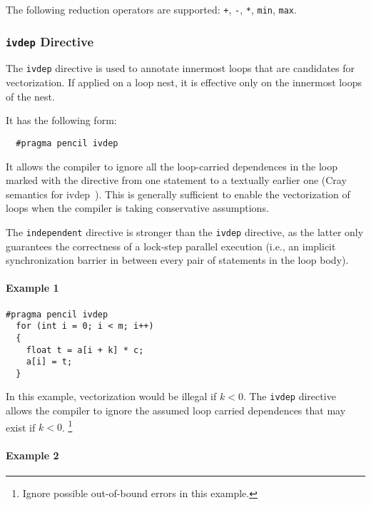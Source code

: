 The following reduction operators are supported:
\lstinline!+!, \lstinline!-!, \lstinline!*!, \lstinline!min!, \lstinline!max!.

\subsubsection{\texttt{ivdep} Directive\label{sec:ivdep}}

The \lstinline!ivdep! directive is used to annotate innermost loops that are candidates
  for vectorization.  If applied on a loop nest, it is effective only on
  the innermost loops of the nest.

  It has the following form:
  \begin{lstlisting}
  #pragma pencil ivdep
  \end{lstlisting}
  
  It allows the
  compiler to ignore all the loop-carried dependences in the loop marked with
  the directive from one statement to a textually earlier one (Cray semantics for ivdep~\cite{cray}).
  This is generally sufficient to enable the vectorization
  of loops when the compiler is taking conservative assumptions.

  The \lstinline!independent!  directive is stronger than the
  \lstinline!ivdep! directive, as the latter only guarantees the
  correctness of a lock-step parallel execution (i.e., an implicit
  synchronization barrier in between every pair of statements in the loop
  body).
  
  \paragraph{Example 1}

  \begin{lstlisting}[language=pencil]
  #pragma pencil ivdep
  for (int i = 0; i < m; i++)
  {
    float t = a[i + k] * c;
    a[i] = t;
  }
  \end{lstlisting}
  In this example, vectorization would be illegal if $k < 0$.  The
  \lstinline!ivdep! directive allows the compiler to ignore the assumed
  loop carried dependences that may exist if $k < 0$. \footnote{Ignore
  possible out-of-bound errors in this example.}
  
  \paragraph{Example 2}
  

